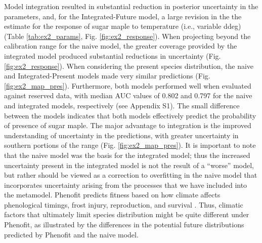 \documentclass[11pt]{article}
\newcommand{\rev}[1]{{\color{RoyalBlue}#1}}
\begin{document}
Model integration resulted in substantial reduction in posterior uncertainty in the parameters, and, for the Integrated-Future model, a large revision in the the estimate for the response of sugar maple to temperature (i.e., variable ddeg) (Table \ref{tab:ex2_params}, Fig. \ref{fig:ex2_response}).
When projecting beyond the calibration range for the naive model, the greater coverage provided by the integrated model produced substantial reductions in uncertainty (Fig. \ref{fig:ex2_response}).
When considering the present species distribution, the naive and Integrated-Present models made very similar predictions (Fig. \ref{fig:ex2_map_pres}).
Furthermore, both models performed well when evaluated against reserved data, with \rev{median} AUC values of 0.802 and 0.797 for the naive and integrated models, respectively (see Appendix S1).
The small difference between the models indicates that both models effectively predict the probability of presence of sugar maple.
The major advantage to integration is the improved understanding of uncertainty in the predictions, with greater uncertainty in southern portions of the range (Fig. \ref{fig:ex2_map_pres}).
It is important to note that the naive model was the basis for the integrated model; thus the increased uncertainty present in the integrated model is not the result of a ``worse'' model, but rather should be viewed as a correction to overfitting in the naive model that incorporates uncertainty arising from the processes that we have included into the metamodel.
Phenofit predicts fitness based on how climate affects phenological timings, frost injury, reproduction, and survival \citep{Chuine2001, Morin2009}.
Thus, climatic factors that ultimately limit species distribution might be quite different under Phenofit, as illustrated by the differences in the potential future distributions predicted by Phenofit and the naive model.
\end{document}
